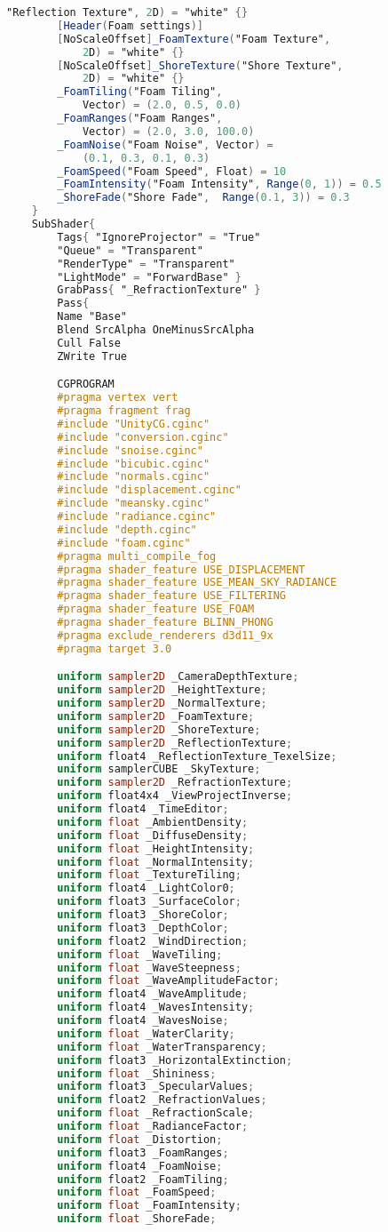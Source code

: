 \begin{lstlisting}[language=GLSL, caption={\label{cf:agua} \textit{Shader} de efeito de água na Unity}]
			"Reflection Texture", 2D) = "white" {}
		[Header(Foam settings)]
		[NoScaleOffset]_FoamTexture("Foam Texture", 
			2D) = "white" {}
		[NoScaleOffset]_ShoreTexture("Shore Texture", 
			2D) = "white" {}
		_FoamTiling("Foam Tiling", 
			Vector) = (2.0, 0.5, 0.0)
		_FoamRanges("Foam Ranges", 
			Vector) = (2.0, 3.0, 100.0)
		_FoamNoise("Foam Noise", Vector) = 
			(0.1, 0.3, 0.1, 0.3)
		_FoamSpeed("Foam Speed", Float) = 10
		_FoamIntensity("Foam Intensity", Range(0, 1)) = 0.5
		_ShoreFade("Shore Fade",  Range(0.1, 3)) = 0.3
	} 
	SubShader{
		Tags{ "IgnoreProjector" = "True"
		"Queue" = "Transparent"
		"RenderType" = "Transparent"
		"LightMode" = "ForwardBase" }
		GrabPass{ "_RefractionTexture" }
		Pass{
		Name "Base"
		Blend SrcAlpha OneMinusSrcAlpha
		Cull False
		ZWrite True

		CGPROGRAM
		#pragma vertex vert
		#pragma fragment frag
		#include "UnityCG.cginc"
		#include "conversion.cginc"
		#include "snoise.cginc"
		#include "bicubic.cginc"
		#include "normals.cginc"
		#include "displacement.cginc"
		#include "meansky.cginc"
		#include "radiance.cginc"
		#include "depth.cginc"
		#include "foam.cginc"
		#pragma multi_compile_fog
		#pragma shader_feature USE_DISPLACEMENT
		#pragma shader_feature USE_MEAN_SKY_RADIANCE
		#pragma shader_feature USE_FILTERING
		#pragma shader_feature USE_FOAM
		#pragma shader_feature BLINN_PHONG
		#pragma exclude_renderers d3d11_9x 
		#pragma target 3.0

		uniform sampler2D _CameraDepthTexture;
		uniform sampler2D _HeightTexture;
		uniform sampler2D _NormalTexture;
		uniform sampler2D _FoamTexture;
		uniform sampler2D _ShoreTexture;
		uniform sampler2D _ReflectionTexture; 
		uniform float4 _ReflectionTexture_TexelSize;
		uniform samplerCUBE _SkyTexture;
		uniform sampler2D _RefractionTexture;
		uniform float4x4 _ViewProjectInverse;
		uniform float4 _TimeEditor;
		uniform float _AmbientDensity;
		uniform float _DiffuseDensity;
		uniform float _HeightIntensity;
		uniform float _NormalIntensity;
		uniform float _TextureTiling;
		uniform float4 _LightColor0;
		uniform float3 _SurfaceColor;
		uniform float3 _ShoreColor;
		uniform float3 _DepthColor;
		uniform float2 _WindDirection;
		uniform float _WaveTiling;
		uniform float _WaveSteepness;
		uniform float _WaveAmplitudeFactor;
		uniform float4 _WaveAmplitude;
		uniform float4 _WavesIntensity;
		uniform float4 _WavesNoise;
		uniform float _WaterClarity;
		uniform float _WaterTransparency;
		uniform float3 _HorizontalExtinction;
		uniform float _Shininess;
		uniform float3 _SpecularValues;
		uniform float2 _RefractionValues;
		uniform float _RefractionScale;
		uniform float _RadianceFactor;
		uniform float _Distortion;
		uniform float3 _FoamRanges;
		uniform float4 _FoamNoise;
		uniform float2 _FoamTiling;
		uniform float _FoamSpeed;
		uniform float _FoamIntensity;
		uniform float _ShoreFade;


\end{lstlisting}
